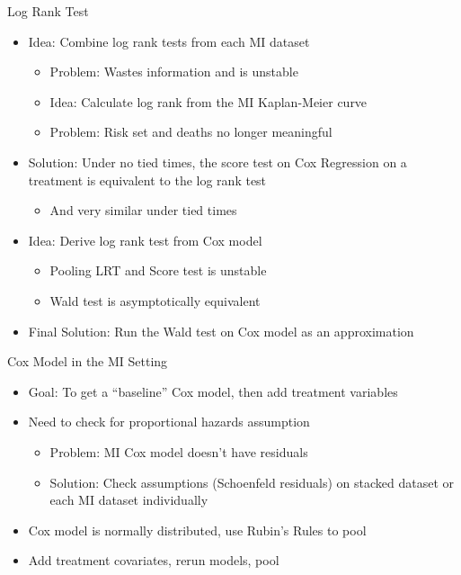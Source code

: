 \begin{frame}{Log Rank Test}
 \begin{itemize}
  \item Idea: Combine log rank tests from each MI dataset
  \begin{itemize}
  \item Problem: Wastes information and is unstable \cite{Marshall2009}
  \item Idea: Calculate log rank from the MI Kaplan-Meier curve
  \item Problem: Risk set and deaths no longer meaningful
  \end{itemize}

  \item Solution: Under no tied times, the score test on
  Cox Regression on a treatment is equivalent to the
log rank test
\begin{itemize}
 \item And very similar under tied times
\end{itemize}
\item Idea: Derive log rank test from Cox model
\begin{itemize}
 \item Pooling LRT and Score test is unstable \cite{Marshall2009}
 \item Wald test is asymptotically equivalent
\end{itemize}
 \item Final Solution: Run the Wald test on Cox model as an approximation

 \end{itemize}

\end{frame}

\begin{frame}{Cox Model in the MI Setting}
\begin{itemize}
 \item Goal: To get a ``baseline'' Cox model, then add treatment variables
 \item Need to check for proportional hazards assumption
 \begin{itemize}
  \item Problem:  MI Cox model doesn't have residuals
  \item Solution: Check assumptions (Schoenfeld residuals) on stacked dataset or each MI dataset individually
 \end{itemize}
\item Cox model is normally distributed, use Rubin's Rules to pool
\item Add treatment covariates, rerun models, pool
\end{itemize}

 
\end{frame}
